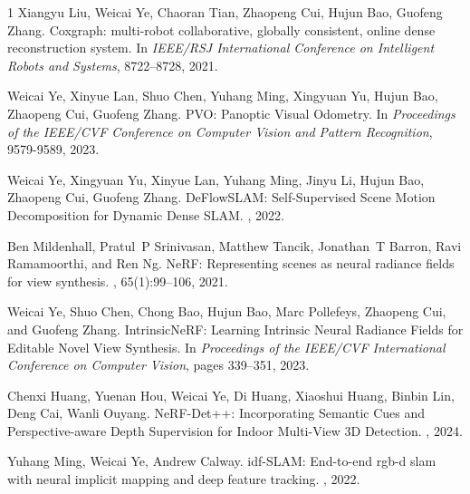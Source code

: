 \begin{thebibliography}{1}
Xiangyu Liu, Weicai Ye, Chaoran Tian, Zhaopeng Cui, Hujun Bao, Guofeng Zhang.
\newblock Coxgraph: multi-robot collaborative, globally consistent, online dense reconstruction system.
\newblock In {\em IEEE/RSJ International Conference on Intelligent Robots and Systems}, 8722--8728, 2021.

Weicai Ye, Xinyue Lan, Shuo Chen, Yuhang Ming, Xingyuan Yu, Hujun Bao, Zhaopeng Cui, Guofeng Zhang.
\newblock PVO: Panoptic Visual Odometry.
\newblock In {\em Proceedings of the IEEE/CVF Conference on Computer Vision and Pattern Recognition}, 9579-9589, 2023.

Weicai Ye, Xingyuan Yu, Xinyue Lan, Yuhang Ming, Jinyu Li, Hujun Bao, Zhaopeng Cui, Guofeng Zhang.
\newblock DeFlowSLAM: Self-Supervised Scene Motion Decomposition for Dynamic Dense SLAM.
, 2022.


Ben Mildenhall, Pratul~P Srinivasan, Matthew Tancik, Jonathan~T Barron, Ravi Ramamoorthi, and Ren Ng.
\newblock NeRF: Representing scenes as neural radiance fields for view synthesis.
, 65(1):99--106, 2021.

Weicai Ye, Shuo Chen, Chong Bao, Hujun Bao, Marc Pollefeys, Zhaopeng Cui, and Guofeng Zhang.
\newblock IntrinsicNeRF: Learning Intrinsic Neural Radiance Fields for Editable Novel View Synthesis.
\newblock In {\em Proceedings of the IEEE/CVF International Conference on Computer Vision}, pages 339--351, 2023.

Chenxi Huang, Yuenan Hou, Weicai Ye, Di Huang, Xiaoshui Huang, Binbin Lin, Deng Cai,  Wanli Ouyang.
\newblock NeRF-Det++: Incorporating Semantic Cues and Perspective-aware Depth Supervision for Indoor Multi-View 3D Detection.
, 2024.

Yuhang Ming, Weicai Ye, Andrew Calway.
\newblock idf-SLAM: End-to-end rgb-d slam with neural implicit mapping and deep feature tracking.
, 2022.



\end{thebibliography}
